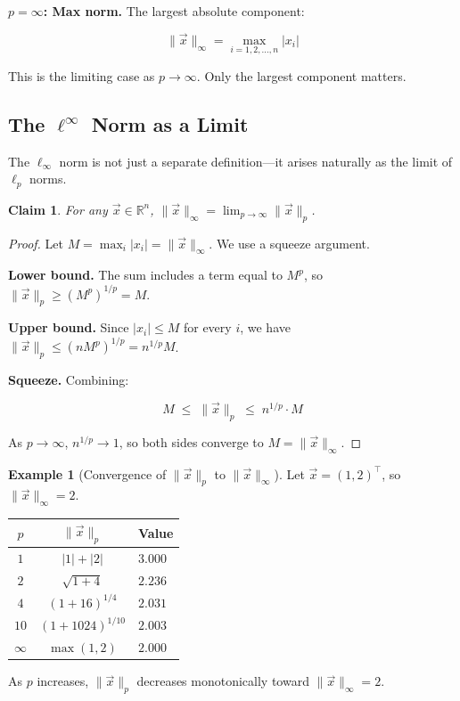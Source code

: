 \documentclass[10pt, twocolumn]{article}
\theoremstyle{definition}
\newtheorem{example}{Example}
\theoremstyle{plain}
\newtheorem{claim}{Claim}
\newcommand{\RR}{\mathbb{R}}
\begin{document}
\textbf{$p = \infty$: Max norm.} The largest absolute component:
\begin{result}
\[
    \|\vec{x}\|_\infty = \max_{i = 1, 2, \ldots, n} |x_i|
\]
\end{result}

This is the limiting case as $p \to \infty$. Only the largest component matters.

\subsection{The $\ell^\infty$ Norm as a Limit}

The $\ell_\infty$ norm is not just a separate definition---it arises naturally as the limit of $\ell_p$ norms.

\begin{tcolorbox}
\begin{claim}
For any $\vec{x} \in \RR^n$, $\|\vec{x}\|_\infty = \lim_{p \to \infty} \|\vec{x}\|_p$.
\end{claim}
\end{tcolorbox}

\begin{proof}
Let $M = \max_{i} |x_i| = \|\vec{x}\|_\infty$. We use a squeeze argument.

\textbf{Lower bound.} The sum includes a term equal to $M^p$, so $\|\vec{x}\|_p \ge (M^p)^{1/p} = M$.

\textbf{Upper bound.} Since $|x_i| \le M$ for every $i$, we have $\|\vec{x}\|_p \le (nM^p)^{1/p} = n^{1/p} M$.

\textbf{Squeeze.} Combining:
\begin{result}
\[
    M \;\le\; \|\vec{x}\|_p \;\le\; n^{1/p} \cdot M
\]
\end{result}
As $p \to \infty$, $n^{1/p} \to 1$, so both sides converge to $M = \|\vec{x}\|_\infty$.
\end{proof}

\begin{example}[Convergence of $\|\vec{x}\|_p$ to $\|\vec{x}\|_\infty$]
Let $\vec{x} = (1, 2)^\top$, so $\|\vec{x}\|_\infty = 2$.

\begin{center}
\begin{tabular}{ccl}
\toprule
$p$ & $\|\vec{x}\|_p$ & Value \\
\midrule
$1$ & $|1| + |2|$ & $3.000$ \\
$2$ & $\sqrt{1 + 4}$ & $2.236$ \\
$4$ & $(1 + 16)^{1/4}$ & $2.031$ \\
$10$ & $(1 + 1024)^{1/10}$ & $2.003$ \\
$\infty$ & $\max(1, 2)$ & $2.000$ \\
\bottomrule
\end{tabular}
\end{center}

As $p$ increases, $\|\vec{x}\|_p$ decreases monotonically toward $\|\vec{x}\|_\infty = 2$.
\end{example}
\end{document}
